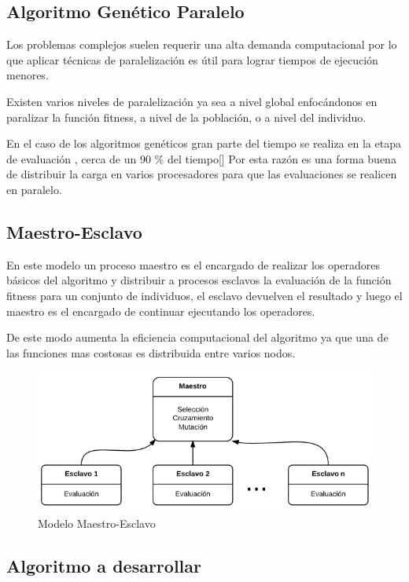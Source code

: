\subsection{Algoritmo Genético Paralelo}
Los problemas complejos suelen requerir una alta demanda computacional por lo que aplicar técnicas de paralelización es útil para lograr tiempos de ejecución menores.

Existen varios niveles de paralelización ya sea a nivel global enfocándonos en paralizar la función fitness, a nivel de la población, o a nivel del individuo. \citep{Nesmachnow2002}

En el caso de los algoritmos genéticos gran parte del tiempo se realiza en la etapa de evaluación , cerca de un 90 \% del tiempo[]
Por esta razón es una forma buena de distribuir la carga en varios procesadores para que las evaluaciones se realicen en paralelo.


\subsection{Maestro-Esclavo}

En este modelo un proceso maestro es el encargado de realizar los operadores básicos del algoritmo y distribuir a procesos esclavos la evaluación de la función fitness para un conjunto de individuos, el esclavo devuelven el resultado y luego el maestro es el encargado de continuar ejecutando los operadores.

De este modo aumenta la eficiencia computacional del algoritmo ya que una de las funciones mas costosas es distribuida entre varios nodos.

\begin{figure}[H]
\centering
\includegraphics[width=0.7\linewidth]{Figures/diagrama-master-slave}
\caption[Modelo Maestro-Esclavo]{Modelo Maestro-Esclavo}
\label{fig:diagrama-master-slave}
\end{figure}



\subsection{Algoritmo a desarrollar}


